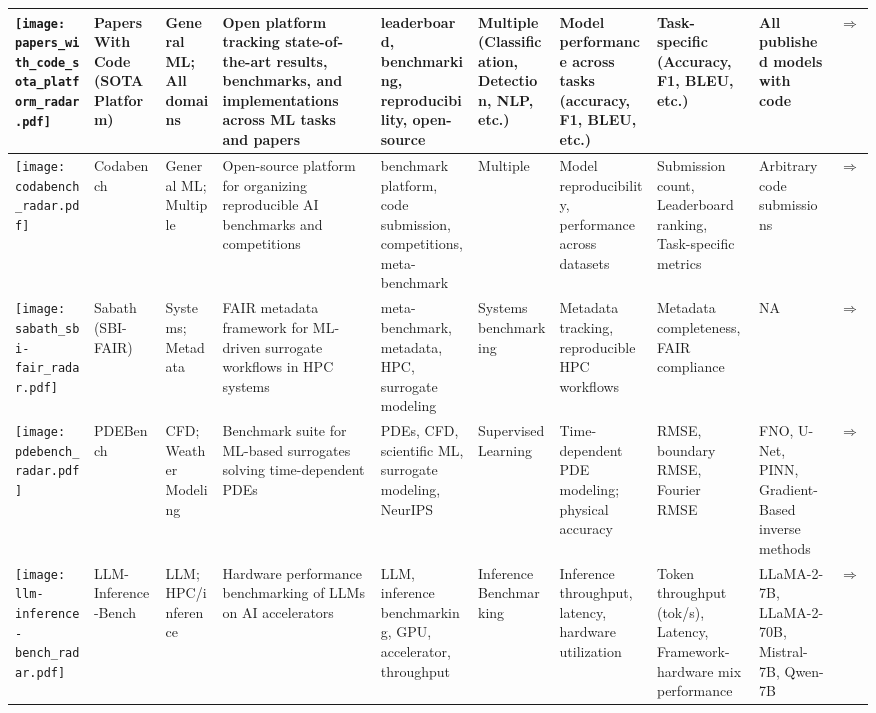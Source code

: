 \begin{landscape}
{\begin{longtable}{|p{}|p{}|p{}|p{}|p{}|p{}|p{}|p{}|p{}|p{}|}
\texttt{[image: papers\_with\_code\_sota\_platform\_radar.pdf]} & Papers With Code (SOTA Platform) & General ML; All domains & Open platform tracking state-of-the-art results, benchmarks, and implementations across ML tasks and papers & leaderboard, benchmarking, reproducibility, open-source & Multiple (Classification, Detection, NLP, etc.) & Model performance across tasks (accuracy, F1, BLEU, etc.) & Task-specific (Accuracy, F1, BLEU, etc.) & All published models with code & \cite{pmlr-v37-blum15}\href{https://paperswithcode.com/sota}{$\Rightarrow$} \\ \hline
\texttt{[image: codabench\_radar.pdf]} & Codabench & General ML; Multiple & Open-source platform for organizing reproducible AI benchmarks and competitions & benchmark platform, code submission, competitions, meta-benchmark & Multiple & Model reproducibility, performance across datasets & Submission count, Leaderboard ranking, Task-specific metrics & Arbitrary code submissions & \cite{xu-2022}\href{https://www.codabench.org/}{$\Rightarrow$} \\ \hline
\texttt{[image: sabath\_sbi-fair\_radar.pdf]} & Sabath (SBI-FAIR) & Systems; Metadata & FAIR metadata framework for ML-driven surrogate workflows in HPC systems & meta-benchmark, metadata, HPC, surrogate modeling & Systems benchmarking & Metadata tracking, reproducible HPC workflows & Metadata completeness, FAIR compliance & NA & \cite{luszczek2021sabath}\href{https://sbi-fair.github.io/docs/software/sabath/}{$\Rightarrow$} \\ \hline
\texttt{[image: pdebench\_radar.pdf]} & PDEBench & CFD; Weather Modeling & Benchmark suite for ML-based surrogates solving time-dependent PDEs & PDEs, CFD, scientific ML, surrogate modeling, NeurIPS & Supervised Learning & Time-dependent PDE modeling; physical accuracy & RMSE, boundary RMSE, Fourier RMSE & FNO, U-Net, PINN, Gradient-Based inverse methods & \cite{takamoto2024pdebenchextensivebenchmarkscientific}\href{https://github.com/pdebench/PDEBench}{$\Rightarrow$} \\ \hline
\texttt{[image: llm-inference-bench\_radar.pdf]} & LLM-Inference-Bench & LLM; HPC/inference & Hardware performance benchmarking of LLMs on AI accelerators & LLM, inference benchmarking, GPU, accelerator, throughput & Inference Benchmarking & Inference throughput, latency, hardware utilization & Token throughput (tok/s), Latency, Framework-hardware mix performance & LLaMA-2-7B, LLaMA-2-70B, Mistral-7B, Qwen-7B & \cite{10820566}\href{https://github.com/argonne-lcf/LLM-Inference-Bench}{$\Rightarrow$} \\ \hline

\end{longtable}}
\end{landscape}
